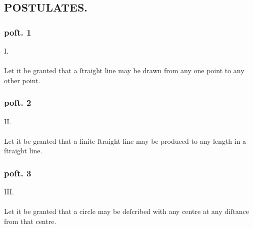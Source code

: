 \hfill

\hfill

\begin{minipage}{0.67\textwidth}
    \subsection[Postulates]{\centering \scshape{\LARGE{POSTULATES.}}}
    \label{subsec:postulates}

    \hfill

    \subsubsection{poſt. 1}
    \begin{center}
        I.\label{post1}\\
        \hfill\\
        Let it be granted that a ſtraight line may be drawn from any one point to any other point.
    \end{center}
    \subsubsection{poſt. 2}
    \begin{center}
        II.\label{post2}\\
        \hfill\\
        Let it be granted that a finite ſtraight line may be produced to any length in a ſtraight line.
    \end{center}
    \subsubsection{poſt. 3}
    \begin{center}
        III.\label{post3}\\
        \hfill\\
        Let it be granted that a circle may be deſcribed with any centre at any diſtance from that centre.
    \end{center}
\end{minipage}

\pagebreak

